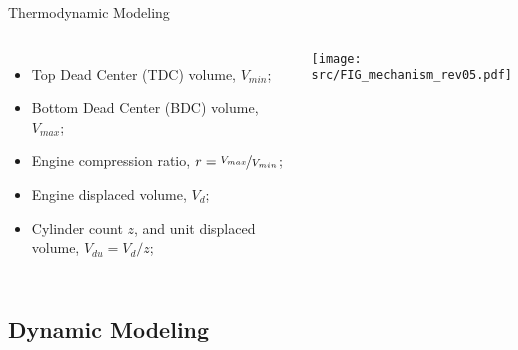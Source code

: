 \begin{frame}{Thermodynamic Modeling}
\begin{columns}
{\begin{itemize}
                    \item Top Dead Center (TDC) volume, \alert{$V_{min}$};
                    \item Bottom Dead Center (BDC) volume, \alert{$V_{max}$};
                    \item Engine compression ratio, \alert{$r=\nicefrac{V_{max}}{V_{min}}$};
                    \item Engine displaced volume, \alert{$V_{d}$};
                    \item Cylinder count \alert{$z$}, and unit displaced volume,
                        \alert{$V_{du}=V_d/z$};
                \end{itemize}
            }

        \vspace*{-4mm}%
        \hspace*{-6mm}\texttt{[image: src/FIG\_mechanism\_rev05.pdf]}

        \end{columns}
    \end{frame}

\subsection{Dynamic Modeling}

